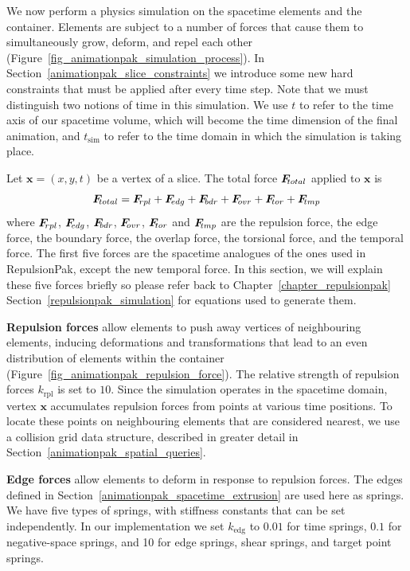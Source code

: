\newtext
{
We now perform a physics simulation on the spacetime elements and the 
container.  Elements are subject to a number of forces that cause them
to simultaneously grow, deform, and repel each other (Figure~\ref{fig_animationpak_simulation_process}).
In Section~\ref{animationpak_slice_constraints} we introduce some new hard
constraints that must be applied after every time step.
Note that we must distinguish two notions of time in this simulation.  We use
$t$ to refer to the time axis of our spacetime volume, which will become
the time dimension of the final animation, and $t_\mathrm{sim}$ to
refer to the time domain in which the simulation is taking place.
}

\newtext
{
Let $\bm{x} = (x, y, t)$ be a vertex of a slice.
The total force $\simforce{total} $ applied to $\bm{x}$ is
\begin{equation}
\simforce{total}  = \simforce{rpl} + \simforce{edg} + \simforce{bdr} + \simforce{ovr} + \simforce{tor} + \simforce{tmp}
\end{equation}
where $\simforce{rpl}$, $\simforce{edg}$, $\simforce{bdr}$, $\simforce{ovr}$,  $\simforce{tor}$ and $\simforce{tmp}$ are 
the repulsion force, the edge force, the boundary force, the overlap force, the torsional force, and the temporal force.
The first five forces are the spacetime analogues of the ones used in RepulsionPak, except the new temporal force.
In this section, we will explain these five forces briefly 
so please refer back to Chapter~\ref{chapter_repulsionpak} Section~\ref{repulsionpak_simulation}
for equations used to generate them.
}

\newtext
{
\textbf{Repulsion forces} allow elements to push away vertices of 
neighbouring elements, inducing deformations and transformations that lead 
to an even distribution of elements within the container
(Figure~\ref{fig_animationpak_repulsion_force}).
The relative strength of repulsion forces $k_\mathrm{rpl}$ is set to $10$.
Since the simulation operates in the spacetime domain,
vertex $\bm{x}$ accumulates repulsion forces from points at
various time positions.
To locate these points on neighbouring elements that are considered 
nearest, we use a collision grid data structure, described in greater
detail in Section~\ref{animationpak_spatial_queries}.
}

\newtext
{
\textbf{Edge forces}
allow elements to deform in response to repulsion forces.
The edges defined in Section~\ref{animationpak_spacetime_extrusion} are used here as springs.
We have five types of springs, with stiffness constants that can be 
set independently.  In our implementation we set $k_\mathrm{edg}$ 
to $0.01$ for time springs, $0.1$ for negative-space springs,
and 10 for edge springs, shear springs, and target point springs.
}

